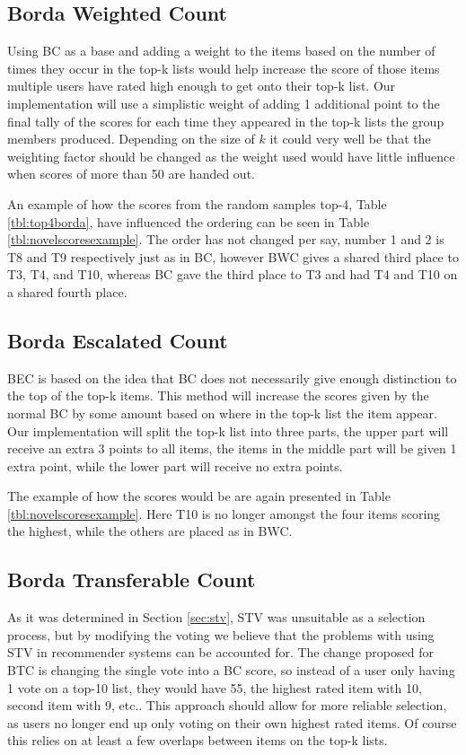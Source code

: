 \subsection{Borda Weighted Count}
Using BC as a base and adding a weight to the items based on the number of times they occur in the top-k lists would help increase the score of those items multiple users have rated high enough to get onto their top-k list. Our implementation will use a simplistic weight of adding 1 additional point to the final tally of the scores for each time they appeared in the top-k lists the group members produced. Depending on the size of $k$ it could very well be that the weighting factor should be changed as the weight used would have little influence when scores of more than 50 are handed out.

An example of how the scores from the random samples top-4, Table \ref{tbl:top4borda}, have influenced the ordering can be seen in Table \ref{tbl:novelscoresexample}. The order has not changed per say, number 1 and 2 is T8 and T9 respectively just as in BC, however BWC gives a shared third place to T3, T4, and T10, whereas BC gave the third place to T3 and had T4 and T10 on a shared fourth place. 

\subsection{Borda Escalated Count}
BEC is based on the idea that BC does not necessarily give enough distinction to the top of the top-k items. This method will increase the scores given by the normal BC by some amount based on where in the top-k list the item appear. Our implementation will split the top-k list into three parts, the upper part will receive an extra 3 points to all items, the items in the middle part will be given 1 extra point, while the lower part will receive no extra points.

The example of how the scores would be are again presented in Table \ref{tbl:novelscoresexample}. Here T10 is no longer amongst the four items scoring the highest, while the others are placed as in BWC.

\subsection{Borda Transferable Count} \label{BTC}
As it was determined in Section \ref{sec:stv}, STV was unsuitable as a selection process, but by modifying the voting we believe that the problems with using STV in recommender systems can be accounted for. The change proposed for BTC is changing the single vote into a BC score, so instead of a user only having 1 vote on a top-10 list, they would have 55, the highest rated item with 10, second item with 9, etc.. This approach should allow for more reliable selection, as users no longer end up only voting on their own highest rated items. Of course this relies on at least a few overlaps between items on the top-k lists.

